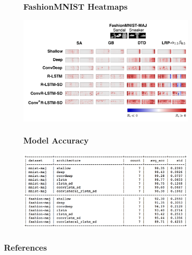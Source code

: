 \documentclass[Nike]{tuberlinbeamer}
\begin{document}
\begin{frame}
\vfill
 \begin{figure}[h]
 	\frametitle{FashionMNIST Heatmaps}
	\includegraphics [width=0.8\textwidth]{figures/present_backup_fmnist_heatmaps}
\end{figure}
\vfill
\end{frame}

\begin{frame}
\vfill
 \begin{figure}[h]
 	\frametitle{Model Accuracy}
	\includegraphics [width=0.8\textwidth]{figures/model_accuracy}
\end{figure}
\vfill
	
\end{frame}


\begin{frame}[allowframebreaks]
        \frametitle{References}
        
        
\end{frame}
\end{document}
